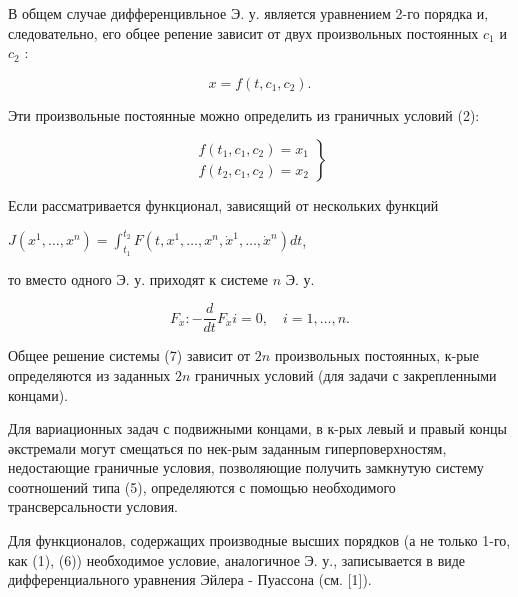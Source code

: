\documentclass[10pt]{article}
\begin{document}
В общем случае дифференцивльное Э. у. является уравнением 2-го порядка и, следовательно, его обцее репение зависит от двух произвольных постоянных $c_{1}$ и $c_{2}$ :



\[

x=f\left(t, c_{1}, c_{2}\right) .

\]



Эти произвольные постоянные можно определить из граничных условий (2):



\[

\left.\begin{array}{l}

f\left(t_{1}, c_{1}, c_{2}\right)=x_{1} \\

f\left(t_{2}, c_{1}, c_{2}\right)=x_{2}

\end{array}\right\}

\]



Если рассматривается функционал, зависящий от нескольких функций



$J\left(x^{1}, \ldots, x^{n}\right)=\int_{t_{1}}^{t_{2}} F\left(t, x^{1}, \ldots, x^{n}, \dot{x}^{1}, \ldots, \dot{x}^{n}\right) d t$,



то вместо одного Э. у. приходят к системе $n$ Э. у.



\[

F_{\dot{x}}:-\frac{d}{d t} F_{\dot{x}} i=0, \quad i=1, \ldots, n .

\]



Общее решение системы (7) зависит от $2 n$ произвольных постоянных, к-рые определяются из заданных $2 n$ граничных условий (для задачи с закрепленными концами).



Для вариационных задач с подвижными концами, в к-рых левый и правый концы әкстремали могут смещаться по нек-рым заданным гиперповерхностям, недостающие граничные условия, позволяющие получить замкнутую систему соотношений типа (5), определяются с помощью необходимого трансверсальности условия.



Для функционалов, содержащих производные высших порядков (а не только 1-го, как (1), (6)) необходимое условие, аналогичное Э. у., записывается в виде дифференциального уравнения Эйлера - Пуассона (см. [1]).
\end{document}
